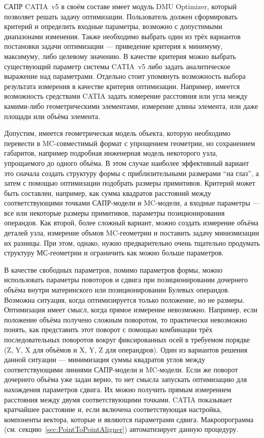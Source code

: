 САПР CATIA~v5 в своём составе имеет модуль DMU Optimizer, который позволяет решать задачу оптимизации. Пользователь должен сформировать критерий и определить входные параметры, возможно с допустимыми диапазонами изменения. Также необходимо выбрать один из трёх вариантов постановки задачи оптимизации --- приведение критерия к минимуму, максимуму, либо целевому значению. В качестве критерия можно выбрать существующий параметр системы CATIA~v5 либо задать аналитическое выражение над параметрами. Отдельно стоит упомянуть возможность выбора результата измерения в качестве критерия оптимизации. Например, имеется возможность средствами CATIA задать измерение расстояния или угла между камими-либо геометрическими элементами, измерение длины элемента, или даже площади или объёма элемента.

Допустим, имеется геометрическая модель объекта, которую необходимо перевести в MC-совместимый формат с упрощением геометрии, но сохранением габаритов, например подробная инженерная модель некоторого узла, упрощаемого до одного объёма. В этом случае наиболее эффективный вариант это сначала создать структуру формы с приблизительными размерами ``на глаз'', а затем с помощью оптимизации подобрать размеры примитивов. Критерий может быть составлен, например, как сумма квадратов расстояний между соответствующими точками САПР-модели и MC-модели, а входные параметры --- все или некоторые размеры примитивов, параметры позиционирования операндов.
Как второй, более сложный вариант, можно создать измерение объёма деталей узла, измерение объмов MC-геометрии и поставить задачу минизмизации их разницы. При этом, однако, нужно предварительно очень тщательно продумать структуру МС-геометрии и ограничить как можно больше параметров.

В качестве свободных параметров, помимо параметров формы, можно использовать параметры повоторов и сдвига при позиционировании дочернего объёма внутри материнского или позиционировании Булевых операндов. Возможна ситуация, когда оптимизируется только положение, но не размеры. Оптимизация имеет смысл, когда прямое измерение невозможно. Например, если положение объёма получено сложным поворотом, то практически невозможно понять, как представить этот поворот с помощью комбинации трёх последовательных поворотов вокруг фиксированных осей в требуемом порядке (Z, Y, X для объёмов и X, Y, Z для операндров). Один из вариантов решения данной ситуации --- минимизация суммы квадратов углов между соответствующими линиями САПР-модели и MC-модели. Если же поворот дочернего объёма уже задан верно, то нет смысла запускать оптимизацию для нахождения параметров сдвига. Их можно получить прямым измерением расстояния между двумя соответствующими точками. CATIA показывает кратчайшее расстояние и, если включена соответствующая настройка, компоненты вектора, которые и являются параметрами сдвига. Макропрограмма  (см. секцию~\ref{sec:PointToPointAligner}) автоматизирует данную процедуру.

